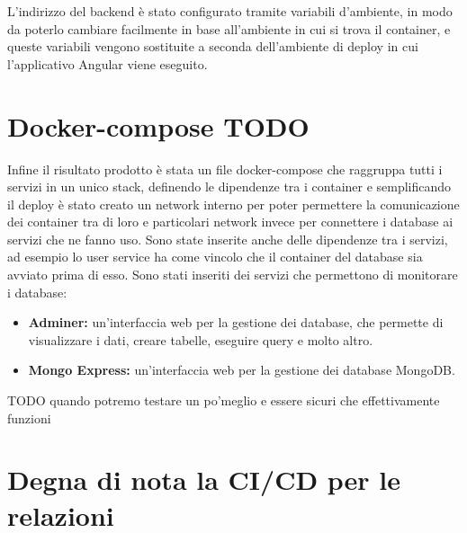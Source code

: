 L'indirizzo del backend è stato configurato tramite variabili d'ambiente, in modo da poterlo cambiare facilmente in base all'ambiente in cui si trova il container, e queste variabili vengono sostituite a seconda dell'ambiente di deploy in cui l'applicativo Angular viene eseguito.


\section{Docker-compose TODO}

Infine il risultato prodotto è stata un file docker-compose che raggruppa tutti i servizi in un unico stack, definendo le dipendenze tra i container e semplificando il deploy
è stato creato un network interno per poter permettere la comunicazione dei container tra di loro e particolari network invece per connettere i database ai servizi che ne fanno uso.
Sono state inserite anche delle dipendenze tra i servizi, ad esempio lo user service ha come vincolo che il container del database sia avviato prima di esso. 
\vspace{0.5cm}
Sono stati inseriti dei servizi che permettono di monitorare i database: 
\begin{itemize}
    \item \textbf{Adminer:} un'interfaccia web per la gestione dei database, che permette di visualizzare i dati, creare tabelle, eseguire query e molto altro.
    \item \textbf{Mongo Express:} un'interfaccia web per la gestione dei database MongoDB.
\end{itemize}

TODO quando potremo testare un po'meglio e essere sicuri che effettivamente funzioni

\section{Degna di nota la CI/CD per le relazioni}


